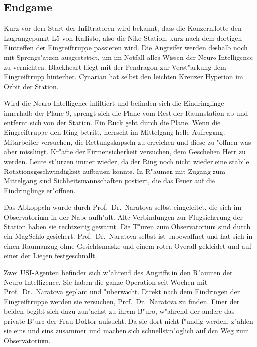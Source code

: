 \subsection{Endgame}

Kurz vor dem Start der Infiltratoren wird bekannt, dass die Konzernflotte den Lagrangepunkt L5 von Kallisto, also die Nike Station, kurz nach dem dortigen Eintreffen der Eingreiftruppe passieren wird. Die Angreifer werden deshalb noch mit Sprengs"atzen ausgestattet, um im Notfall alles Wissen der Neuro Intelligence zu vernichten. Blackheart fliegt mit der Pendragon zur Verst"arkung dem Eingreiftrupp hinterher. Cynarian hat selbst den leichten Kreuzer Hyperion im Orbit der Station.

Wird die Neuro Intelligence infiltiert und befinden sich die Eindringlinge innerhalb der Plane 9, sprengt sich die Plane vom Rest der Raumstation ab und entfernt sich von der Station. Ein Ruck geht durch die Plane. Wenn die Eingreiftruppe den Ring betritt, herrscht im Mittelgang helle Aufregung. Mitarbeiter versuchen, die Rettungskapseln zu erreichen und diese zu "offnen was aber misslingt. Kr"afte der Firmensicherheit versuchen, dem Geschehen Herr zu werden. Leute st"urzen immer wieder, da der Ring noch nicht wieder eine stabile Rotationsgeschwindigkeit aufbauen konnte. In R"aumen mit Zugang zum Mittelgang sind Sichheitsmannschaften postiert, die das Feuer auf die Eindringlinge er"offnen.

Das Abkoppeln wurde durch Prof.~Dr.~Naratova selbst eingeleitet, die sich im Observatorium in der Nabe aufh"alt. Alte Verbindungen zur Flugsicherung der Station haben sie rechtzeitig gewarnt. Die T"uren zum Observatorium sind durch ein MagSchlo\3 gesichert. Prof.~Dr.~Naratova selbst ist unbewaffnet und hat sich in einen Raumanzug ohne Gesichtsmaske und einem roten Overall gekleidet und auf einer der Liegen festgeschnallt.

Zwei USI-Agenten befinden sich w"ahrend des Angriffs in den R"aumen der Neuro Intelligence. Sie haben die ganze Operation seit Wochen mit Prof.~Dr.~Naratova geplant und "uberwacht. Direkt nach dem Eindringen der Eingreiftruppe werden sie versuchen, Prof.~Dr.~Naratova zu finden. Einer der beiden begibt sich dazu zun"achst zu ihrem B"uro, w"ahrend der andere das private B"uro der Frau Doktor aufsucht. Da sie dort nicht f"undig werden, z"ahlen sie eins und eins zusammen und machen  sich schnellstm"oglich auf den Weg zum Observatorium.

